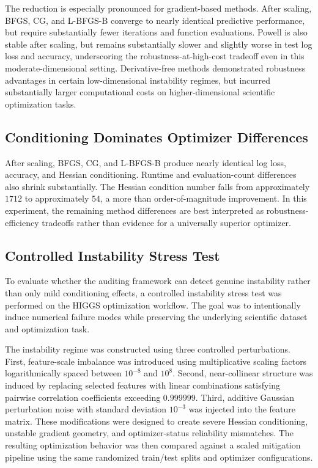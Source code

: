 The reduction is especially pronounced for gradient-based methods. After scaling, BFGS, CG, and L-BFGS-B converge to nearly identical predictive performance, but require substantially fewer iterations and function evaluations. Powell is also stable after scaling, but remains substantially slower and slightly worse in test log loss and accuracy, underscoring the robustness-at-high-cost tradeoff even in this moderate-dimensional setting. Derivative-free methods demonstrated robustness advantages in certain low-dimensional instability regimes, but incurred substantially larger computational costs on higher-dimensional scientific optimization tasks.

\subsection{Conditioning Dominates Optimizer Differences}

After scaling, BFGS, CG, and L-BFGS-B produce nearly identical log loss, accuracy, and Hessian conditioning. Runtime and evaluation-count differences also shrink substantially. The Hessian condition number falls from approximately $1712$ to approximately $54$, a more than order-of-magnitude improvement. In this experiment, the remaining method differences are best interpreted as robustness-efficiency tradeoffs rather than evidence for a universally superior optimizer.


\subsection{Controlled Instability Stress Test}

To evaluate whether the auditing framework can detect genuine instability rather than only mild conditioning effects, a controlled instability stress test was performed on the HIGGS optimization workflow. The goal was to intentionally induce numerical failure modes while preserving the underlying scientific dataset and optimization task.

The instability regime was constructed using three controlled perturbations. First, feature-scale imbalance was introduced using multiplicative scaling factors logarithmically spaced between \(10^{-8}\) and \(10^{8}\). Second, near-collinear structure was induced by replacing selected features with linear combinations satisfying pairwise correlation coefficients exceeding \(0.999999\). Third, additive Gaussian perturbation noise with standard deviation \(10^{-3}\) was injected into the feature matrix. These modifications were designed to create severe Hessian conditioning, unstable gradient geometry, and optimizer-status reliability mismatches. The resulting optimization behavior was then compared against a scaled mitigation pipeline using the same randomized train/test splits and optimizer configurations.

